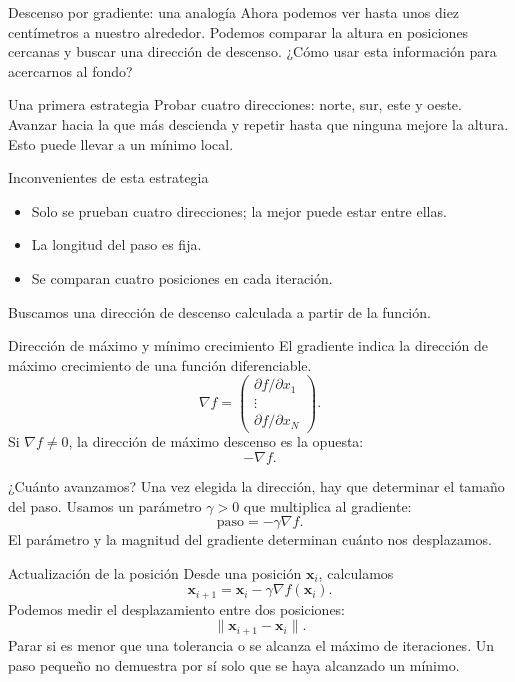 \documentclass[original_version/main.tex]{subfiles}
\begin{document}
\begin{frame}[t]{Descenso por gradiente: una analogía}
Ahora podemos ver hasta unos diez centímetros a nuestro alrededor.
\bigskip
Podemos comparar la altura en posiciones cercanas y buscar una dirección de descenso.
\bigskip
¿Cómo usar esta información para acercarnos al fondo?
\end{frame}
\begin{frame}[t]{Una primera estrategia}
\small Probar cuatro direcciones: norte, sur, este y oeste. Avanzar hacia la que más descienda y repetir hasta que ninguna mejore la altura.
\medskip Esto puede llevar a un mínimo local.
\end{frame}
\begin{frame}[t]{Inconvenientes de esta estrategia}
\begin{itemize}
\item Solo se prueban cuatro direcciones; la mejor puede estar entre ellas.
\item La longitud del paso es fija.
\item Se comparan cuatro posiciones en cada iteración.
\end{itemize}
\bigskip
Buscamos una dirección de descenso calculada a partir de la función.
\end{frame}
\begin{frame}[t]{Dirección de máximo y mínimo crecimiento}
El gradiente indica la dirección de máximo crecimiento de una función diferenciable.
\[\nabla f=\begin{pmatrix}\partial f/\partial x_1\\\vdots\\\partial f/\partial x_N\end{pmatrix}.\]
Si $\nabla f\ne0$, la dirección de máximo descenso es la opuesta:
\[\boxed{-\nabla f}.\]
\end{frame}
\begin{frame}[t]{¿Cuánto avanzamos?}
Una vez elegida la dirección, hay que determinar el tamaño del paso.
\bigskip
Usamos un parámetro $\gamma>0$ que multiplica al gradiente:
\[\boxed{\text{paso}=-\gamma\nabla f}.\]
El parámetro y la magnitud del gradiente determinan cuánto nos desplazamos.
\end{frame}
\begin{frame}[t]{Actualización de la posición}
Desde una posición $\boldsymbol{x}_i$, calculamos
\[\boxed{\boldsymbol{x}_{i+1}=\boldsymbol{x}_i-\gamma\nabla f(\boldsymbol{x}_i)}.\]
Podemos medir el desplazamiento entre dos posiciones:
\[\|\boldsymbol{x}_{i+1}-\boldsymbol{x}_i\|.\]
Parar si es menor que una tolerancia o se alcanza el máximo de iteraciones. Un paso pequeño no demuestra por sí solo que se haya alcanzado un mínimo.
\end{frame}
\end{document}
